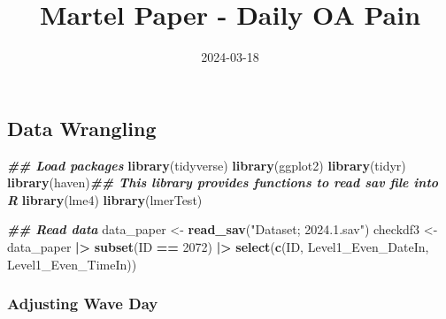 \documentclass[
  12pt,
]{article}
\title{Martel Paper - Daily OA Pain}
\author{}
\date{\vspace{-2.5em}2024-03-18}
\newenvironment{Shaded}{\begin{snugshade}}{\end{snugshade}}
\newcommand{\DecValTok}[1]{\textcolor[rgb]{0.00,0.00,0.81}{#1}}
\newcommand{\DocumentationTok}[1]{\textcolor[rgb]{0.56,0.35,0.01}{\textbf{\textit{#1}}}}
\newcommand{\FunctionTok}[1]{\textcolor[rgb]{0.13,0.29,0.53}{\textbf{#1}}}
\newcommand{\NormalTok}[1]{#1}
\newcommand{\OtherTok}[1]{\textcolor[rgb]{0.56,0.35,0.01}{#1}}
\newcommand{\SpecialCharTok}[1]{\textcolor[rgb]{0.81,0.36,0.00}{\textbf{#1}}}
\newcommand{\StringTok}[1]{\textcolor[rgb]{0.31,0.60,0.02}{#1}}
\begin{document}
\maketitle

\hypertarget{data-wrangling}{%
\subsection{Data Wrangling}\label{data-wrangling}}

\begin{Shaded}
\begin{Highlighting}[]
\DocumentationTok{\#\# Load packages}
\FunctionTok{library}\NormalTok{(tidyverse)}
\FunctionTok{library}\NormalTok{(ggplot2)}
\FunctionTok{library}\NormalTok{(tidyr)}
\FunctionTok{library}\NormalTok{(haven)}\DocumentationTok{\#\# This library provides functions to read sav file into R}
\FunctionTok{library}\NormalTok{(lme4)}
\FunctionTok{library}\NormalTok{(lmerTest)}
\end{Highlighting}
\end{Shaded}

\begin{Shaded}
\begin{Highlighting}[]
\DocumentationTok{\#\# Read data}
\NormalTok{data\_paper }\OtherTok{\textless{}{-}} \FunctionTok{read\_sav}\NormalTok{(}\StringTok{"Dataset; 2024.1.sav"}\NormalTok{)}
\NormalTok{checkdf3 }\OtherTok{\textless{}{-}}\NormalTok{ data\_paper }\SpecialCharTok{|\textgreater{}} 
  \FunctionTok{subset}\NormalTok{(ID }\SpecialCharTok{==} \DecValTok{2072}\NormalTok{) }\SpecialCharTok{|\textgreater{}} 
  \FunctionTok{select}\NormalTok{(}\FunctionTok{c}\NormalTok{(ID, }
\NormalTok{           Level1\_Even\_DateIn, }
\NormalTok{           Level1\_Even\_TimeIn))}
\end{Highlighting}
\end{Shaded}

\hypertarget{adjusting-wave-day}{%
\subsubsection{Adjusting Wave Day}\label{adjusting-wave-day}}
\end{document}
